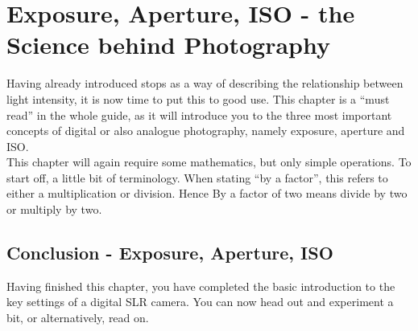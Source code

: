 \chapter{Exposure, Aperture, ISO - the Science behind Photography}
\label{chap:Aperture-Exposure-ISO}

Having already introduced \glspl{stop} as a way of describing the relationship between light intensity, it is now time to put this to good use. This chapter is a ``must read'' in the whole guide, as it will introduce you to the three most important concepts of digital or also analogue photography, namely \gls{exposure}, \gls{aperture} and \gls{ISO}.
\\
This chapter will again require some mathematics, but only simple operations. To start off, a little bit of terminology. When stating ``by a factor'', this refers to either a multiplication or division. Hence By a factor of two means divide by two or multiply by two.







\section{Conclusion - Exposure, Aperture, ISO}

Having finished this chapter, you have completed the basic introduction to the key settings of a digital \gls{SLR} camera. You can now head out and experiment a bit, or alternatively, read on.